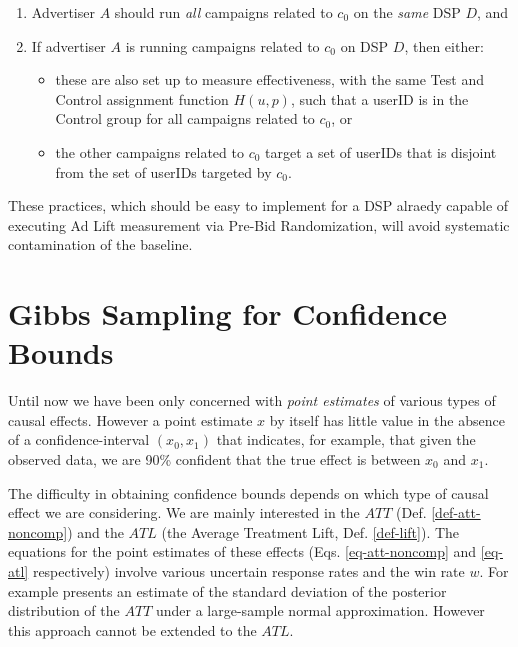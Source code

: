 \documentclass[11pt,a4paper]{article}
\theoremstyle{definition}
\theoremstyle{remark}
\theoremstyle{definition}
\theoremstyle{definition}
\theoremstyle{definition}
\theoremstyle{definition}
\theoremstyle{definition}
\theoremstyle{definition}
\newtheorem{assumption}{Assumption
}[section]
\begin{document}
\begin{enumerate}
		\item Advertiser $A$ should run \textit{all} campaigns related to $c_0$  on the \textit{same} DSP $D$, and 
		\item If advertiser $A$ is running campaigns related to $c_0$ on DSP $D$, then either:
	\begin{itemize}
		\item these are also set up to measure effectiveness, with the same Test and Control assignment function $H(u,p)$, such that a userID is in the Control group for all campaigns related to $c_0$, or
		\item the other campaigns related to $c_0$ target a set of userIDs that is disjoint from the set of userIDs targeted by $c_0$. %
	\end{itemize}
\end{enumerate}

These practices, which should be easy to implement for a DSP alraedy capable of executing Ad Lift measurement via Pre-Bid Randomization, will avoid systematic contamination of the baseline.  

\section{Gibbs Sampling for Confidence Bounds} \label{sec-gibbs}

Until now we have been only concerned with \textit{point estimates} of various types of causal effects. However a point estimate $x$ by itself has little value in the absence of a confidence-interval $(x_0,x_1)$ that indicates, for example, that given the observed data, we are 90\% confident that the true effect is between $x_0$ and $x_1$.

The difficulty in obtaining confidence bounds depends on which type of causal effect we are considering. 
We are mainly interested in the $ATT$ (Def. \ref{def-att-noncomp}) and the 
$ATL$ (the Average Treatment Lift, Def. \ref{def-lift}). 
The equations for the point estimates of these effects (Eqs. \ref{eq-att-noncomp} and \ref{eq-atl} respectively) involve various uncertain response rates and the win rate $w$. 
For example \cite{Imbens1997a} presents an estimate of the standard deviation of the posterior distribution of the $ATT$ under a large-sample normal approximation. 
However this approach cannot be extended to the $ATL$.
\end{document}
